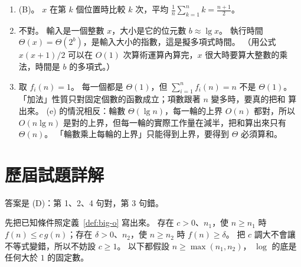 \begin{enumerate}
結束：迴圈停在 $\mathit{lo} = \mathit{hi}$。 這時 $A[1..\mathit{lo}-1]$ 都小於 $x$、
$A[\mathit{lo}..n]$ 都大於等於 $x$，所以 $\mathit{lo}$ 正是第一個大於等於 $x$ 的位置
（$\mathit{lo} = n + 1$ 表示全部都小於 $x$）。

會停：每一輪 $\mathit{hi} - \mathit{lo}$ 都嚴格變小（$\mathit{lo}$ 變成
$\mathit{mid} + 1 > \mathit{lo}$，或 $\mathit{hi}$ 變成 $\mathit{mid} < \mathit{hi}$），
而它是非負整數，所以有限輪後一定變成 $0$。 每一輪大約減半，共 $\Theta(\lg n)$ 輪。

\item (B)。 $x$ 在第 $k$ 個位置時比較 $k$ 次，平均
$\frac{1}{n}\sum_{k=1}^{n} k = \frac{n+1}{2}$。

\item 不對。 輸入是一個整數 $x$，大小是它的位元數 $b \approx \lg x$。 執行時間
$\Theta(x) = \Theta(2^b)$，是輸入大小的指數，這是擬多項式時間。 （用公式
$x(x+1)/2$ 可以在 $O(1)$ 次算術運算內算完，$x$ 很大時要算大整數的乘法，時間是
$b$ 的多項式。）

\item 取 $f_i(n) = 1$。 每一個都是 $\Theta(1)$，但 $\sum_{i=1}^{n} f_i(n) = n$ 不是
$\Theta(1)$。 「加法」性質只對固定個數的函數成立；項數跟著 $n$ 變多時，要真的把和
算出來。 (e) 的情況相反：輪數 $\Theta(\lg n)$，每一輪的上界 $O(n)$ 都對，所以
$O(n \lg n)$ 是對的上界，但每一輪的實際工作量在減半，把和算出來只有 $\Theta(n)$。
「輪數乘上每輪的上界」只能得到上界，要得到 $\Theta$ 必須算和。
\end{enumerate}

\section*{歷屆試題詳解}

答案是 (D)：第 1、2、4 句對，第 3 句錯。

先把已知條件照定義~\ref{def:big-o} 寫出來。 存在 $c > 0$、$n_1$，使 $n \ge n_1$ 時
$f(n) \le c\,g(n)$；存在 $\delta > 0$、$n_2$，使 $n \ge n_2$ 時 $f(n) \ge \delta$。 把
$c$ 調大不會讓不等式變錯，所以不妨設 $c \ge 1$。 以下都假設 $n \ge \max(n_1, n_2)$，
$\log$ 的底是任何大於 $1$ 的固定數。

